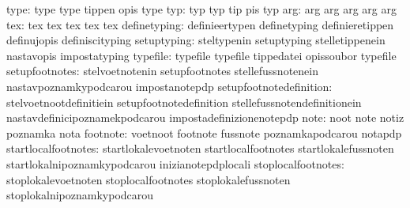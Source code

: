                             type: type                             type
                                  tippen                           opis
                                  type
                             typ: typ                              typ
                                  tip                              pis
                                  typ
                             arg: arg                              arg
                                  arg                              arg
                                  arg
                             tex: tex                              tex
                                  tex                              tex
                                  tex
                    definetyping: definieertypen                   definetyping
                                  definieretippen                  definujopis
                                  definiscityping %
                     setuptyping: steltypenin                      setuptyping
                                  stelletippenein                  nastavopis
                                  impostatyping %
                        typefile: typefile                         typefile
                                  tippedatei                       opissoubor
                                  typefile %
                  setupfootnotes: stelvoetnotenin                  setupfootnotes
                                  stellefussnotenein               nastavpoznamkypodcarou
                                  impostanotepdp
         setupfootnotedefinition: stelvoetnootdefinitiein          setupfootnotedefinition
                                  stellefussnotendefinitionein     nastavdefinicipoznamekpodcarou
                                  impostadefinizionenotepdp
                            note: noot                             note
                                  notiz                            poznamka
                                  nota
                        footnote: voetnoot                         footnote
                                  fussnote                         poznamkapodcarou
                                  notapdp
             startlocalfootnotes: startlokalevoetnoten             startlocalfootnotes
                                  startlokalefussnoten             startlokalnipoznamkypodcarou
                                  inizianotepdplocali
              stoplocalfootnotes: stoplokalevoetnoten              stoplocalfootnotes
                                  stoplokalefussnoten              stoplokalnipoznamkypodcarou
